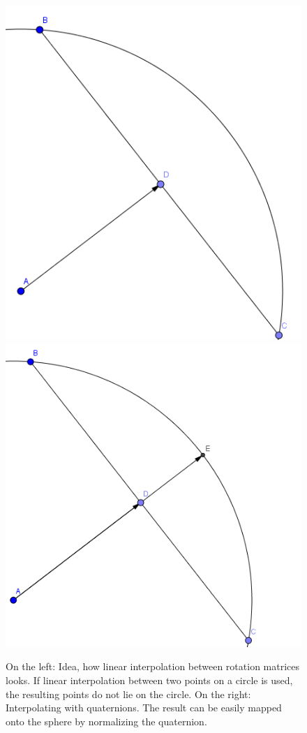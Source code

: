 \begin{figure}[tb]
	\centering
	\includegraphics[width=0.3\linewidth]{images/quatrot1} 
	\includegraphics[width=0.33\linewidth]{images/quatrot2} 
	\caption{\label{fig:image} On the left: Idea, how linear interpolation between rotation matrices looks. If linear interpolation between two points on a circle is used, the resulting points do not lie on the circle. On the right: Interpolating with quaternions. The result can be easily mapped onto the sphere by normalizing the quaternion.
	}
\end{figure}




